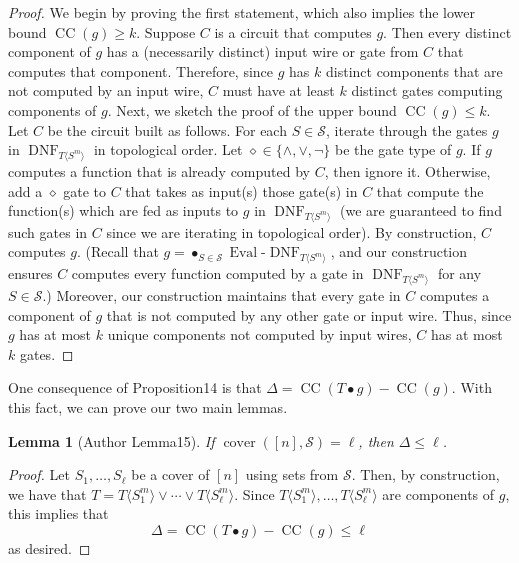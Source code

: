 \documentclass[10pt,a4paper]{article}
\newtheorem{ntlemma}[nttheorem]{Lemma}
\newcommand{\CCirc}{\operatorname{CC}}
\begin{document}
\begin{proof}
We begin by proving the first statement, which also implies the lower bound $\CCirc(g)\geq k$. Suppose $C$ is a circuit that computes $g$. Then every distinct component of $g$ has a (necessarily distinct) input wire or gate from $C$ that computes that component. Therefore, since $g$ has $k$ distinct components that are not computed by an input wire, $C$ must have at least $k$ distinct gates computing components of $g$.
Next, we sketch the proof of the upper bound $\CCirc(g)\leq k$. Let $C$ be the circuit built as follows. For each $S\in\mathcal S$, iterate through the gates $g$ in $\operatorname{DNF}_{T\langle S^m\rangle}$ in topological order. Let $\diamond\in\{\land,\lor,\neg\}$ be the gate type of $g$. If $g$ computes a function that is already computed by $C$, then ignore it. Otherwise, add a $\diamond$ gate to $C$ that takes as input(s) those gate(s) in $C$ that compute the function(s) which are fed as inputs to $g$ in $\operatorname{DNF}_{T\langle S^m\rangle}$ (we are guaranteed to find such gates in $C$ since we are iterating in topological order).
By construction, $C$ computes $g$. (Recall that $g=\mathop{\bullet}_{S\in\mathcal S}\operatorname{Eval}\text{-}\operatorname{DNF}_{T\langle S^m\rangle}$, and our construction ensures $C$ computes every function computed by a gate in $\operatorname{DNF}_{T\langle S^m\rangle}$ for any $S\in\mathcal S$.) Moreover, our construction maintains that every gate in $C$ computes a component of $g$ that is not computed by any other gate or input wire. Thus, since $g$ has at most $k$ unique components not computed by input wires, $C$ has at most $k$ gates.
\end{proof}
One consequence of Proposition14 is that $\Delta=\CCirc(T\bullet g)-\CCirc(g)$. With this fact, we can prove our two main lemmas.
\begin{ntlemma}[Author Lemma15]
If $\operatorname{cover}([n],\mathcal S)=\ell$, then $\Delta\leq\ell$.
\end{ntlemma}
\begin{proof}
Let $S_1,\ldots,S_\ell$ be a cover of $[n]$ using sets from $\mathcal S$. Then, by construction, we have that $T=T\langle S_1^m\rangle\lor\cdots\lor T\langle S_\ell^m\rangle$. Since $T\langle S_1^m\rangle,\ldots,T\langle S_\ell^m\rangle$ are components of $g$, this implies that
\[\Delta=\CCirc(T\bullet g)-\CCirc(g)\leq\ell\]
as desired.
\end{proof}
\end{document}
